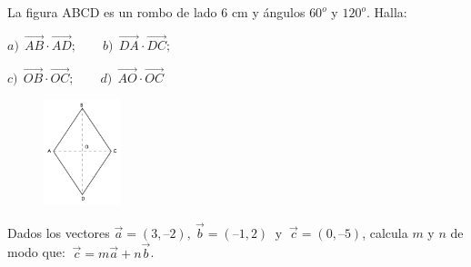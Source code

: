 \begin{mipropuesto}

\begin{multicols}{2}
La figura ABCD es un rombo de lado 6 cm y ángulos $60^o$ y $120^o$. Halla:

\vspace{6mm} $a) \ \ \overrightarrow{AB} \cdot \overrightarrow{AD}; \qquad  b) \ \ \overrightarrow{DA} \cdot \overrightarrow{DC};$

\vspace{4mm} $c)\ \  \overrightarrow{OB}\cdot \overrightarrow{OC};\qquad  d)\ \  \overrightarrow{AO} \cdot \overrightarrow{OC}$	
\begin{figure}[H]
	\centering
	\includegraphics[width=0.2\textwidth]{img-vec/vec16.png}	
\end{figure}
\end{multicols}
\end{mipropuesto}

\vspace{-8mm}
\begin{flushright}
\begin{footnotesize} \textcolor{gris}{}	\end{footnotesize}
\end{flushright}


\begin{mipropuesto}

Dados los vectores $\vec a=(3, –2), \ \vec b=(–1, 2) \ \text{ y } \ \vec c=(0, –5)$, calcula $m$ y $n$ de modo que: $\ \vec c = m\vec a + n\vec b$.

\end{mipropuesto}

\vspace{-8mm}
\begin{flushright}
\begin{footnotesize} \textcolor{gris}{}	\end{footnotesize}
\end{flushright}



